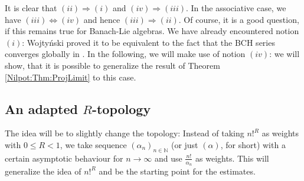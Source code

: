 It is clear that $(ii) \Rightarrow (i)$ and $(iv) \Rightarrow (iii)$. In the 
associative case, we have $(iii) \Leftrightarrow (iv)$ and hence $(iii) 
\Rightarrow (ii)$. Of course, it is a good question, if this remains true for 
Banach-Lie algebras. We have already encountered notion $(i)$: Wojty\'nski 
proved it to be equivalent to the fact that the BCH series converges globally 
in \cite{wojtynski:2000a}. In the following, we will make use of notion $(iv)$: 
we will show, that it is possible to generalize the result of Theorem 
\ref{Nilpot:Thm:ProjLimit} to this case.



\subsection{An adapted $R$-topology}

The idea will be to slightly change the topology: Instead of taking 
$n!^R$ as weights with $0 \leq R < 1$, we take sequence $(\alpha_n)_{n \in 
\mathbb{N}}$ (or just $(\alpha)$, for short) with a certain asymptotic 
behaviour for $n \longrightarrow \infty$ and use $\frac{n!}{\alpha_n}$ as 
weights. This will generalize the idea of $n!^R$ and be the starting point for 
the estimates.

